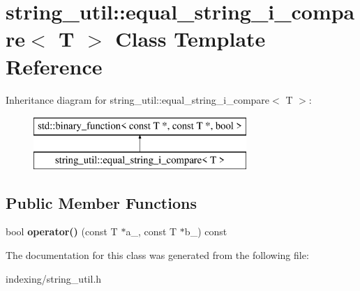 \hypertarget{classstring__util_1_1equal__string__i__compare}{\section{string\-\_\-util\-:\-:equal\-\_\-string\-\_\-i\-\_\-compare$<$ T $>$ Class Template Reference}
\label{classstring__util_1_1equal__string__i__compare}
}
Inheritance diagram for string\-\_\-util\-:\-:equal\-\_\-string\-\_\-i\-\_\-compare$<$ T $>$\-:\begin{figure}[H]
\begin{center}
\leavevmode
\includegraphics[height=2.000000cm]{classstring__util_1_1equal__string__i__compare}
\end{center}
\end{figure}
\subsection*{Public Member Functions}
\begin{DoxyCompactItemize}
\item 
\hypertarget{classstring__util_1_1equal__string__i__compare_af8c94159bbb8903c7cf7b71941a7d2bc}{bool {\bfseries operator()} (const T $\ast$a\-\_\-, const T $\ast$b\-\_\-) const }\label{classstring__util_1_1equal__string__i__compare_af8c94159bbb8903c7cf7b71941a7d2bc}

\end{DoxyCompactItemize}


The documentation for this class was generated from the following file\-:\begin{DoxyCompactItemize}
\item 
indexing/string\-\_\-util.\-h\end{DoxyCompactItemize}
